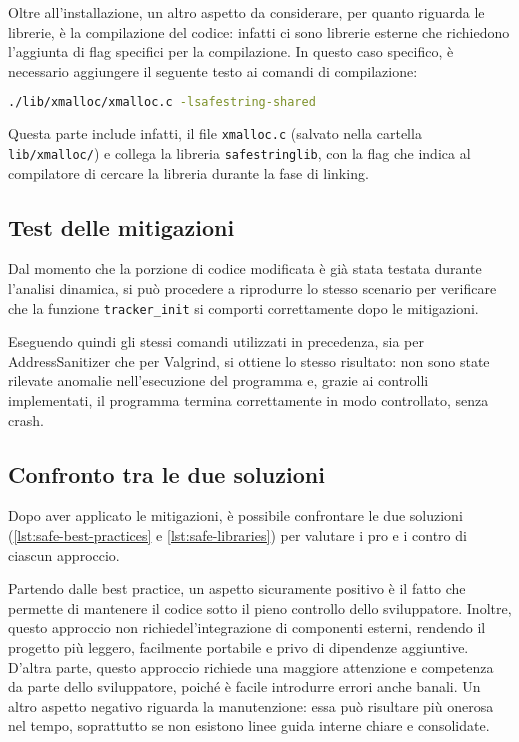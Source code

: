 Oltre all'installazione, un altro aspetto da considerare, per quanto riguarda le
librerie, è la compilazione del codice: infatti ci sono librerie esterne che richiedono
l'aggiunta di flag specifici per la compilazione. In questo caso specifico, è necessario
aggiungere il seguente testo ai comandi di compilazione:
\begin{lstlisting}[language=bash]
./lib/xmalloc/xmalloc.c -lsafestring-shared
\end{lstlisting}
Questa parte include infatti, il file \texttt{xmalloc.c} (salvato nella cartella
\texttt{lib/xmalloc/}) e collega la libreria \texttt{safestringlib}, con la flag
che indica al compilatore di cercare la libreria durante la fase di linking.

\subsection*{Test delle mitigazioni}
\label{sec:test-mitigations}

Dal momento che la porzione di codice modificata è già stata testata durante l'analisi
dinamica, si può procedere a riprodurre lo stesso scenario per verificare che la
funzione \texttt{tracker\_init} si comporti correttamente dopo le mitigazioni.

Eseguendo quindi gli stessi comandi utilizzati in precedenza, sia per AddressSanitizer
che per Valgrind, si ottiene lo stesso risultato: non sono state rilevate anomalie
nell'esecuzione del programma e, grazie ai controlli implementati, il programma termina
correttamente in modo controllato, senza crash.

\subsection*{Confronto tra le due soluzioni}
\label{sec:comparison-case-study}

Dopo aver applicato le mitigazioni, è possibile confrontare le due soluzioni (\autoref{lst:safe-best-practices}
e \autoref{lst:safe-libraries}) per valutare i pro e i contro di ciascun
approccio.

Partendo dalle best practice, un aspetto sicuramente positivo è il fatto che permette
di mantenere il codice sotto il pieno controllo dello sviluppatore. Inoltre, questo
approccio non richiedel'integrazione di componenti esterni, rendendo il progetto
più leggero, facilmente portabile e privo di dipendenze aggiuntive. D'altra
parte, questo approccio richiede una maggiore attenzione e competenza da parte dello
sviluppatore, poiché è facile introdurre errori anche banali. Un altro aspetto negativo
riguarda la manutenzione: essa può risultare più onerosa nel tempo, soprattutto se
non esistono linee guida interne chiare e consolidate.

